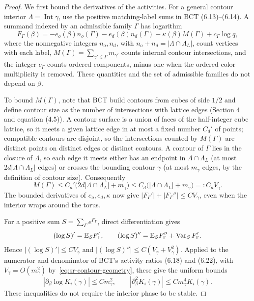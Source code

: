 \begin{proof}
We first bound the derivatives of the activities. For a general
contour interior $\Lambda=\operatorname{Int}\gamma$, use the
positive matching-label sums in BCT (6.13)--(6.14). A summand
indexed by an admissible family $\Gamma$ has logarithm
\begin{equation}
 F_\Gamma(\beta)
 =-e_o(\beta)n_o(\Gamma)-e_d(\beta)n_d(\Gamma)
   -\kappa(\beta)M(\Gamma)+c_\Gamma\log q,
 \label{eq:sr-matching-summand}
\end{equation}
where the nonnegative integers $n_o,n_d$, with
$n_o+n_d=|\Lambda\cap\Lambda_L|$, count vertices with each label,
$M(\Gamma)=\sum_{\gamma'\in\Gamma}m_{\gamma'}$ counts internal contour
intersections, and the integer $c_\Gamma$ counts ordered components,
minus one when the ordered color multiplicity is removed. These
quantities and the set of admissible families do not depend on
$\beta$.

To bound $M(\Gamma)$, note that BCT build contours from cubes of side
$1/2$ and define contour size as the number of intersections with
lattice edges (Section 4 and equation (4.5)). A contour surface is a
union of faces of the half-integer cube lattice, so it meets a given
lattice edge in at most a fixed number $C_d'$ of points; compatible
contours are disjoint, so the intersections counted by $M(\Gamma)$ are
distinct points on distinct edges or distinct contours. A contour of
$\Gamma$ lies in the closure of $\Lambda$, so each edge it meets
either has an endpoint in $\Lambda\cap\Lambda_L$ (at most
$2d|\Lambda\cap\Lambda_L|$ edges) or crosses the bounding contour
$\gamma$ (at most $m_\gamma$ edges, by the definition of contour
size). Consequently
\[
 M(\Gamma)\le C_d'\bigl(2d|\Lambda\cap\Lambda_L|+m_\gamma\bigr)
 \le C_d\bigl(|\Lambda\cap\Lambda_L|+m_\gamma\bigr)
 =:C_d V_\gamma.
\]
The bounded derivatives of $e_o,e_d,\kappa$ now give
$|F_\Gamma'|+|F_\Gamma''|\le C V_\gamma$, even when the interior wraps
around the torus.

For a positive sum $S=\sum_\Gamma e^{F_\Gamma}$, direct differentiation gives
\[
 (\log S)'=\mathbb E_S F_\Gamma',\qquad
 (\log S)''=\mathbb E_S F_\Gamma''+\operatorname{Var}_S F_\Gamma'.
\]
Hence $|(\log S)'|\le CV_\gamma$ and
$|(\log S)''|\le C(V_\gamma+V_\gamma^2)$.
Applied to the numerator and denominator of BCT's activity ratios
(6.18) and (6.22), with $V_\gamma=O(m_\gamma^2)$
by~\eqref{eq:sr-contour-geometry}, these give the uniform bounds
\begin{equation}
 |\partial_\beta\log K_i(\gamma)|\le Cm_\gamma^2,
 \qquad
 |\partial_\beta^2K_i(\gamma)|
                \le Cm_\gamma^4K_i(\gamma).
 \label{eq:sr-activity-derivatives}
\end{equation}
These inequalities do not require the interior phase to be stable.


\end{proof}
